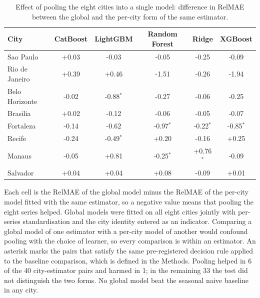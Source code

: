 \begin{table}[htbp]
\centering
\small
\setlength{\tabcolsep}{5pt}
\caption{Effect of pooling the eight cities into a single model: difference in RelMAE
between the global and the per-city form of the same estimator.}
\label{tab:global}
\begin{tabular}{lccccc}
\toprule
City & CatBoost & LightGBM & Random Forest & Ridge & XGBoost \\
\midrule
Sao Paulo & +0.03 & -0.03 & -0.05 & -0.25 & -0.09 \\
Rio de Janeiro & +0.39 & +0.46 & -1.51 & -0.26 & -1.94 \\
Belo Horizonte & -0.02 & -0.88$^{\ast}$ & -0.27 & -0.06 & -0.25 \\
Brasilia & +0.02 & -0.12 & -0.06 & -0.05 & -0.07 \\
Fortaleza & -0.14 & -0.62 & -0.97$^{\ast}$ & -0.22$^{\ast}$ & -0.85$^{\ast}$ \\
Recife & -0.24 & -0.49$^{\ast}$ & +0.20 & -0.16 & +0.25 \\
Manaus & -0.05 & +0.81 & -0.25$^{\ast}$ & +0.76$^{\ast}$ & -0.09 \\
Salvador & +0.04 & +0.04 & +0.08 & -0.09 & +0.01 \\
\bottomrule
\end{tabular}

\vspace{0.5em}
\begin{minipage}{\textwidth}
\footnotesize
Each cell is the RelMAE of the global model minus the RelMAE of the per-city model fitted
with the same estimator, so a negative value means that pooling the eight series helped.
Global models were fitted on all eight cities jointly with per-series standardisation and
the city identity entered as an indicator. Comparing a global model of one estimator with
a per-city model of another would confound pooling with the choice of learner, so every
comparison is within an estimator. An asterisk marks the pairs that satisfy the same
pre-registered decision rule applied to the baseline comparison, which is defined in the
Methods. Pooling helped in 6 of the
40 city-estimator pairs and harmed in 1; in the remaining
33 the test did not distinguish the two forms. No global model
beat the seasonal naive baseline in any city.
\end{minipage}
\end{table}
